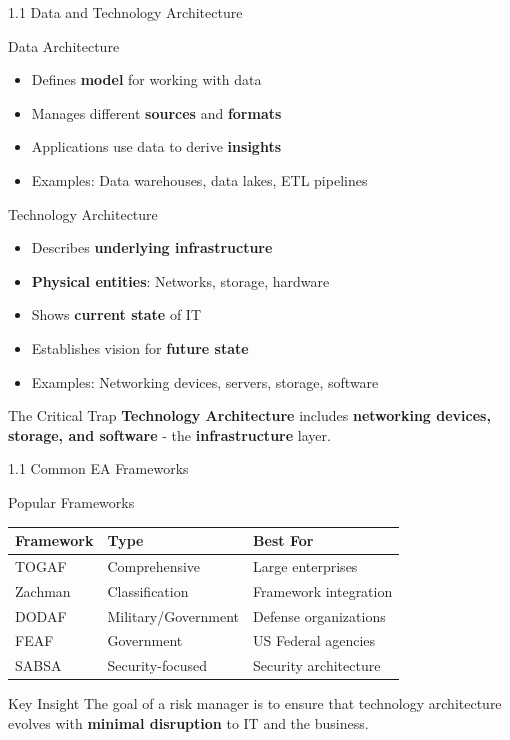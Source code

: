 \documentclass{beamer}
\begin{document}
	\begin{frame}{1.1 Data and Technology Architecture}
		\begin{block}{Data Architecture}
			\begin{itemize}
				\item Defines \textbf{model} for working with data
				\item Manages different \textbf{sources} and \textbf{formats}
				\item Applications use data to derive \textbf{insights}
				\item Examples: Data warehouses, data lakes, ETL pipelines
			\end{itemize}
		\end{block}
		
		\begin{block}{Technology Architecture}
			\begin{itemize}
				\item Describes \textbf{underlying infrastructure}
				\item \textbf{Physical entities}: Networks, storage, hardware
				\item Shows \textbf{current state} of IT
				\item Establishes vision for \textbf{future state}
				\item Examples: Networking devices, servers, storage, software
			\end{itemize}
		\end{block}
		
		\begin{alertblock}{The Critical Trap}
			\textbf{Technology Architecture} includes \textbf{networking devices, storage, and software} - the \textbf{infrastructure} layer.
		\end{alertblock}
	\end{frame}
	
	\begin{frame}{1.1 Common EA Frameworks}
		\begin{block}{Popular Frameworks}
			\begin{tabular}{|p{3cm}|p{4cm}|p{4cm}|}
				\hline
				\textbf{Framework} & \textbf{Type} & \textbf{Best For} \\
				\hline
				TOGAF & Comprehensive & Large enterprises \\
				\hline
				Zachman & Classification & Framework integration \\
				\hline
				DODAF & Military/Government & Defense organizations \\
				\hline
				FEAF & Government & US Federal agencies \\
				\hline
				SABSA & Security-focused & Security architecture \\
				\hline
			\end{tabular}
		\end{block}
		
		\begin{exampleblock}{Key Insight}
			The goal of a risk manager is to ensure that technology architecture evolves with \textbf{minimal disruption} to IT and the business.
		\end{exampleblock}
	\end{frame}
	
\end{document}
